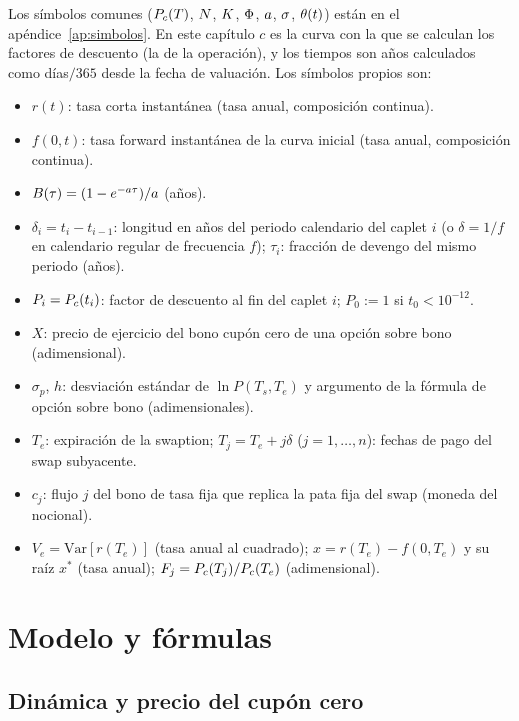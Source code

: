 Los símbolos comunes ($P_{c}(T)$, $N$, $K$, $\Phi$, $a$, $\sigma$, $\theta(t)$) están en el
apéndice~\ref{ap:simbolos}. En este capítulo $c$ es la curva con la que se calculan los factores de descuento
(la de la operación), y los tiempos son años calculados como días$/365$ desde la fecha de valuación. Los
símbolos propios son:
\begin{itemize}
  \item $r(t)$: tasa corta instantánea (tasa anual, composición continua).
  \item $f(0,t)$: tasa forward instantánea de la curva inicial (tasa anual, composición continua).
  \item $B(\tau) = (1-e^{-a\tau})/a$ (años).
  \item $\delta_i = t_i - t_{i-1}$: longitud en años del periodo calendario del caplet $i$ (o $\delta=1/f$ en
        calendario regular de frecuencia $f$); $\tau_i$: fracción de devengo del mismo periodo (años).
  \item $P_i = P_{c}(t_i)$: factor de descuento al fin del caplet $i$; $P_0:=1$ si $t_0<10^{-12}$.
  \item $X$: precio de ejercicio del bono cupón cero de una opción sobre bono (adimensional).
  \item $\sigma_p$, $h$: desviación estándar de $\ln P(T_s,T_e)$ y argumento de la fórmula de opción sobre bono
        (adimensionales).
  \item $T_e$: expiración de la swaption; $T_j=T_e+j\delta$ ($j=1,\dots,n$): fechas de pago del swap subyacente.
  \item $c_j$: flujo $j$ del bono de tasa fija que replica la pata fija del swap (moneda del nocional).
  \item $V_e = \mathrm{Var}[r(T_e)]$ (tasa anual al cuadrado); $x=r(T_e)-f(0,T_e)$ y su raíz $x^*$
        (tasa anual); $F_j=P_{c}(T_j)/P_{c}(T_e)$ (adimensional).
\end{itemize}

\section{Modelo y fórmulas}\label{sec:cap05-modelo}

\subsection{Dinámica y precio del cupón cero}\label{sec:cap05-cupon-cero}

